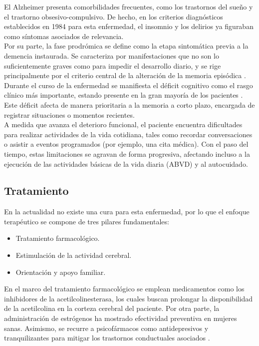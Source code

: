 El Alzheimer presenta comorbilidades frecuentes, como los trastornos del sueño y el trastorno obsesivo-compulsivo. De hecho, en los criterios diagnósticos establecidos en 1984 para esta enfermedad, el insomnio y los delirios ya figuraban como síntomas asociados de relevancia.\\

Por su parte, la fase prodrómica se define como la etapa sintomática previa a la demencia instaurada. Se caracteriza por manifestaciones que no son lo suficientemente graves como para impedir el desarrollo diario, y se rige principalmente por el criterio central de la alteración de la memoria episódica \cite{valls2010diagnostico}.\\

Durante el curso de la enfermedad se manifiesta el déficit cognitivo como el rasgo clínico más importante, estando presente en la gran mayoría de los pacientes \cite{merino2015enfermedad}. Este déficit afecta de manera prioritaria a la memoria a corto plazo, encargada de registrar situaciones o momentos recientes.\\

A medida que avanza el deterioro funcional, el paciente encuentra dificultades para realizar actividades de la vida cotidiana, tales como recordar conversaciones o asistir a eventos programados (por ejemplo, una cita médica). Con el paso del tiempo, estas limitaciones se agravan de forma progresiva, afectando incluso a la ejecución de las actividades básicas de la vida diaria (ABVD) y al autocuidado.

\subsection{Tratamiento}
En la actualidad no existe una cura para esta enfermedad, por lo que el enfoque terapéutico se compone de tres pilares fundamentales: 
\begin{itemize}
    \item Tratamiento farmacológico.
    \item Estimulación de la actividad cerebral.
    \item Orientación y apoyo familiar.
\end{itemize}

En el marco del tratamiento farmacológico se emplean medicamentos como los inhibidores de la acetilcolinesterasa, los cuales buscan prolongar la disponibilidad de la acetilcolina en la corteza cerebral del paciente. Por otra parte, la administración de estrógenos ha mostrado efectividad preventiva en mujeres sanas. Asimismo, se recurre a psicofármacos como antidepresivos y tranquilizantes para mitigar los trastornos conductuales asociados \cite{merino2015enfermedad}.\\

